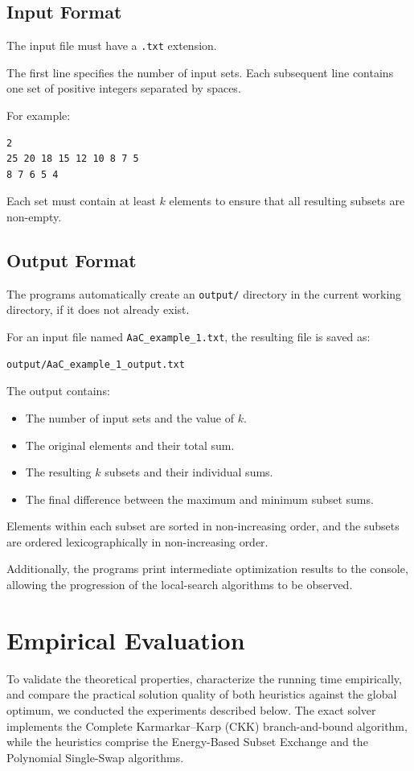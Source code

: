 \documentclass[11pt,a4paper]{article}
\begin{document}
\subsection{Input Format}
The input file must have a \texttt{.txt} extension.

The first line specifies the number of input sets. Each subsequent line contains one set of positive integers separated by spaces.

For example:
\begin{verbatim}
2
25 20 18 15 12 10 8 7 5
8 7 6 5 4
\end{verbatim}
Each set must contain at least $k$ elements to ensure that all resulting subsets are non-empty.
\subsection{Output Format}
The programs automatically create an \texttt{output/} directory in the current working directory, if it does not already exist.

For an input file named \texttt{AaC\_example\_1.txt}, the resulting file is saved as:
\begin{verbatim}
output/AaC_example_1_output.txt
\end{verbatim}
The output contains:
\begin{itemize}
\item The number of input sets and the value of $k$.
\item The original elements and their total sum.
\item The resulting $k$ subsets and their individual sums.
\item The final difference between the maximum and minimum subset sums.
\end{itemize}
Elements within each subset are sorted in non-increasing order, and the subsets are ordered lexicographically in non-increasing order.

Additionally, the programs print intermediate optimization results to the console, allowing the progression of the local-search algorithms to be observed.


\section{Empirical Evaluation}

To validate the theoretical properties, characterize the running time empirically, and compare the practical solution quality of both heuristics against the global optimum, we conducted the experiments described below. The exact solver implements the Complete Karmarkar--Karp (CKK) branch-and-bound algorithm, while the heuristics comprise the Energy-Based Subset Exchange and the Polynomial Single-Swap algorithms.
\end{document}
